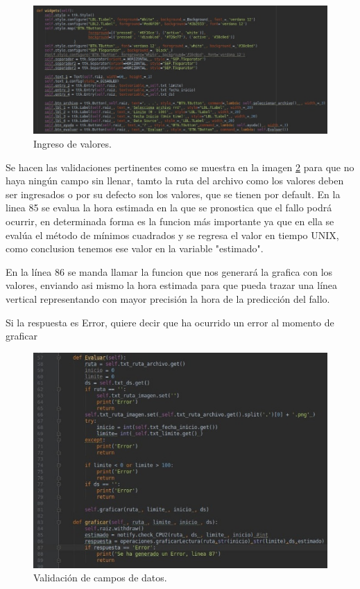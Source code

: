 \begin{itemize}
\FloatBarrier
\begin{figure}[htbp!]
		\centering
		    \includegraphics[width=.9 \textwidth]{../images/ap2.jpeg} 
		\caption{Ingreso de valores.}
		\label{image:ap2}
\end{figure}
\FloatBarrier

Se hacen las validaciones pertinentes como se muestra en la imagen \ref{image:ap1} para que no haya ningún campo sin llenar, tamto la ruta del archivo como los valores deben ser ingresados o por su defecto son los valores, que se tienen por default.
En la linea 85 se evalua la hora estimada en la que se pronostica que el fallo podrá ocurrir, en determinada forma es la funcion más importante ya que en ella se evalúa el método de mínimos cuadrados y se regresa el valor en tiempo UNIX, como conclusion tenemos ese valor en la variable "estimado".

En la línea 86 se manda llamar la funcion que nos generará la grafica con los valores, enviando asi mismo la hora estimada para que pueda trazar una línea vertical representando con mayor precisión la hora de la predicción del fallo.

Si la respuesta es Error, quiere decir que ha ocurrido un error al momento de graficar
\FloatBarrier
\begin{figure}[htbp!]
		\centering
		    \includegraphics[width=.7 \textwidth]{../images/ap1.jpeg} 
		\caption{Validación de campos de datos.}
		\label{image:ap1}
\end{figure}
\FloatBarrier


\end{itemize}
